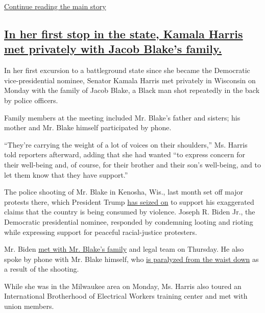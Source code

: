 \protect\hyperlink{after-dfp-ad-mid2}{Continue reading the main story}

\hypertarget{in-her-first-stop-in-the-state-kamala-harris-met-privately-with-jacob-blakes-family}{%
\subsection{\texorpdfstring{\protect\hyperlink{in-her-first-stop-in-the-state-kamala-harris-met-privately-with-jacob-blakes-family}{In
her first stop in the state, Kamala Harris met privately with Jacob
Blake's
family.}}{In her first stop in the state, Kamala Harris met privately with Jacob Blake's family.}}\label{in-her-first-stop-in-the-state-kamala-harris-met-privately-with-jacob-blakes-family}}

In her first excursion to a battleground state since she became the
Democratic vice-presidential nominee, Senator Kamala Harris met
privately in Wisconsin on Monday with the family of Jacob Blake, a Black
man shot repeatedly in the back by police officers.

Family members at the meeting included Mr. Blake's father and sisters;
his mother and Mr. Blake himself participated by phone.

``They're carrying the weight of a lot of voices on their shoulders,''
Ms. Harris told reporters afterward, adding that she had wanted ``to
express concern for their well-being and, of course, for their brother
and their son's well-being, and to let them know that they have
support.''

The police shooting of Mr. Blake in Kenosha, Wis., last month set off
major protests there, which President Trump
\href{https://www.nytimes3xbfgragh.onion/2020/09/01/us/politics/trump-conspiracy-theory-thugs-plane.html}{has
seized on} to support his exaggerated claims that the country is being
consumed by violence. Joseph R. Biden Jr., the Democratic presidential
nominee, responded by condemning looting and rioting while expressing
support for peaceful racial-justice protesters.

Mr. Biden
\href{https://www.nytimes3xbfgragh.onion/2020/09/03/us/politics/joe-biden-kenosha.html}{met
with Mr. Blake's family} and legal team on Thursday. He also spoke by
phone with Mr. Blake himself, who
\href{https://www.nytimes3xbfgragh.onion/2020/09/07/us/jacob-blake-video-statement.html}{is
paralyzed from the waist down} as a result of the shooting.

While she was in the Milwaukee area on Monday, Ms. Harris also toured an
International Brotherhood of Electrical Workers training center and met
with union members.

